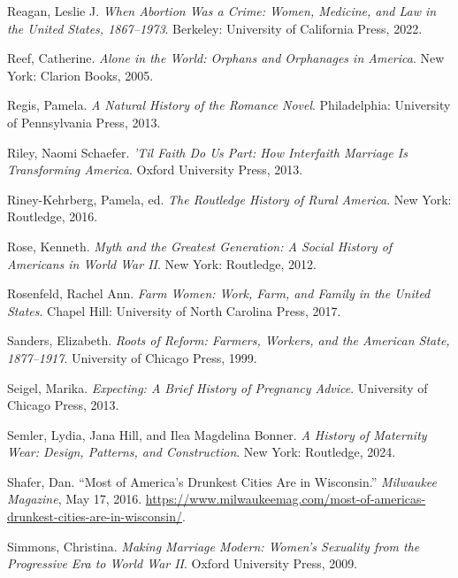 \documentclass[
  american,
  letterpaper,
]{book}
\newlength{\cslhangindent}
\newenvironment{CSLReferences}[2] %
 {\begin{list}{}{%
  \setlength{\itemindent}{0pt}
  \setlength{\leftmargin}{0pt}
  \setlength{\parsep}{0pt}
  \ifodd #1
   \setlength{\leftmargin}{\cslhangindent}
   \setlength{\itemindent}{-1\cslhangindent}
  \fi
  \setlength{\itemsep}{#2\baselineskip}}}
 {\end{list}}
\begin{document}
\begin{CSLReferences}{1}{0}
Reagan, Leslie J. \emph{When Abortion Was a Crime: Women, Medicine, and
Law in the United States, 1867--1973}. Berkeley: University of
California Press, 2022.

Reef, Catherine. \emph{Alone in the World: Orphans and Orphanages in
America}. New York: Clarion Books, 2005.

Regis, Pamela. \emph{A Natural History of the Romance Novel}.
Philadelphia: University of Pennsylvania Press, 2013.

Riley, Naomi Schaefer. \emph{'Til Faith Do Us Part: How Interfaith
Marriage Is Transforming America}. Oxford University Press, 2013.

Riney-Kehrberg, Pamela, ed. \emph{The Routledge History of Rural
America}. New York: Routledge, 2016.

Rose, Kenneth. \emph{Myth and the Greatest Generation: A Social History
of Americans in World War II}. New York: Routledge, 2012.

Rosenfeld, Rachel Ann. \emph{Farm Women: Work, Farm, and Family in the
United States}. Chapel Hill: University of North Carolina Press, 2017.

Sanders, Elizabeth. \emph{Roots of Reform: Farmers, Workers, and the
American State, 1877--1917}. University of Chicago Press, 1999.

Seigel, Marika. \emph{Expecting: A Brief History of Pregnancy Advice}.
University of Chicago Press, 2013.

Semler, Lydia, Jana Hill, and Ilea Magdelina Bonner. \emph{A History of
Maternity Wear: Design, Patterns, and Construction}. New York:
Routledge, 2024.

Shafer, Dan. {``Most of America's Drunkest Cities Are in Wisconsin.''}
\emph{Milwaukee Magazine}, May 17, 2016.
\url{https://www.milwaukeemag.com/most-of-americas-drunkest-cities-are-in-wisconsin/}.

Simmons, Christina. \emph{Making Marriage Modern: Women's Sexuality from
the Progressive Era to World War II}. Oxford University Press, 2009.


\end{CSLReferences}
\end{document}
